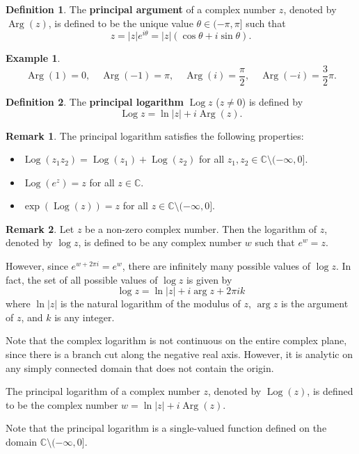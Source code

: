\documentclass[12pt,openany]{book}
\theoremstyle{definition}
\newtheorem{definition}{Definition}[chapter]
\newtheorem{remark}{Remark}[section]
\newtheorem{example}{Example}[section]
\newcommand{\of}[1]{\left( #1 \right)}
\newcommand{\abs}[1]{\left\lvert #1 \right\rvert}
\newcommand{\Log}{\operatorname{Log}}
\newcommand{\Arg}{\operatorname{Arg}}
\begin{document}
	\begin{tcolorbox}[colback=white,colframe=defcolor,arc=5pt,title={\color{white}\bf Principal Argument}]
		\begin{definition}
			The \textbf{principal argument} of a complex number $z$, denoted by $\operatorname{Arg}(z)$, is defined to be the unique value $\theta \in (-\pi, \pi]$ such that $$
			z=\abs{z}e^{i\theta}=\abs{z}\of{\cos\theta+i\sin\theta}.
			$$
		\end{definition}
	\end{tcolorbox}
	\begin{example}
		\[
		\Arg(1)=0,\quad \Arg(-1)=\pi,\quad\Arg(i)=\frac{\pi}{2},\quad\Arg(-i)=\frac{3}{2}\pi.
		\]
	\end{example}
	\vspace{8pt}
	\begin{tcolorbox}[colback=white,colframe=defcolor,arc=5pt,title={\color{white}\bf Principal Logarithm}]
		\begin{definition}
			The \textbf{principal logarithm} $\Log z$ ($z\neq 0$) is defined by \[
			\Log z = \ln\abs{z}+i\Arg(z).
			\]
		\end{definition}
	\end{tcolorbox}
	\vspace{4pt}
	\begin{remark}
		The principal logarithm satisfies the following properties:
		\begin{itemize}
			\item $\operatorname{Log}(z_1 z_2) = \operatorname{Log}(z_1) + \operatorname{Log}(z_2)$ for all $z_1, z_2 \in \mathbb{C} \setminus (-\infty,0]$.
			\item $\operatorname{Log}(e^z) = z$ for all $z \in \mathbb{C}$.
			\item $\exp(\operatorname{Log}(z)) = z$ for all $z \in \mathbb{C} \setminus (-\infty,0]$.
		\end{itemize}
	\end{remark}
	
	\begin{remark}
		Let $z$ be a non-zero complex number. Then the logarithm of $z$, denoted by $\log z$, is defined to be any complex number $w$ such that $e^w = z$.
		
		However, since $e^{w+2\pi i} = e^w$, there are infinitely many possible values of $\log z$. In fact, the set of all possible values of $\log z$ is given by
		\[ \log z = \ln|z| + i\arg z + 2\pi ik \]
		where $\ln|z|$ is the natural logarithm of the modulus of $z$, $\arg z$ is the argument of $z$, and $k$ is any integer.
		
		Note that the complex logarithm is not continuous on the entire complex plane, since there is a branch cut along the negative real axis. However, it is analytic on any simply connected domain that does not contain the origin.
		
		The principal logarithm of a complex number $z$, denoted by $\operatorname{Log}(z)$, is defined to be the complex number $w = \ln |z| + i \operatorname{Arg}(z)$.
		
		Note that the principal logarithm is a single-valued function defined on the domain $\mathbb{C} \setminus (-\infty,0]$.
	\end{remark}
	
\end{document}
